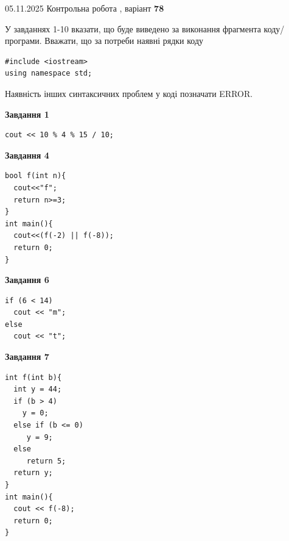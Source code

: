 \documentclass[12pt, ukrainian]{article}
\begin{document}
{\Large{05.11.2025 Контрольна робота , варіант  \No \textbf { 78 }\par}}
{
\begin {large}
У завданнях 1-10 вказати, що буде виведено за виконання фрагмента коду/про\-гра\-ми.
Вважати, що за потреби наявні рядки коду
\begin{verbatim}
#include <iostream>
using namespace std;
\end{verbatim}
Наявність інших синтаксичних проблем у коді позначати ERROR.

\begin{minipage}[t]{7.0cm}

\begin{center}
\textbf{Завдання 1}
\end{center}
\vspace{-8mm}

\begin{verbatim}
cout << 10 % 4 % 15 / 10;
\end{verbatim}



\begin{center}
\textbf{Завдання 4}
\end{center}
\vspace{-8mm}

\begin{verbatim}
bool f(int n){
  cout<<"f";
  return n>=3;
}
int main(){
  cout<<(f(-2) || f(-8));
  return 0;
}
\end{verbatim}



\begin{center}
\textbf{Завдання 6}
\end{center}
\vspace{-8mm}

\begin{verbatim}
if (6 < 14)
  cout << "m";
else
  cout << "t";
\end{verbatim}



\begin{center}
\textbf{Завдання 7}
\end{center}
\vspace{-8mm}

\begin{verbatim}
int f(int b){
  int y = 44;
  if (b > 4)
    y = 0;
  else if (b <= 0)
     y = 9;
  else
     return 5;
  return y;
}
int main(){
  cout << f(-8);
  return 0;
}
\end{verbatim}


\end{minipage}
\end{large}}
\end{document}
